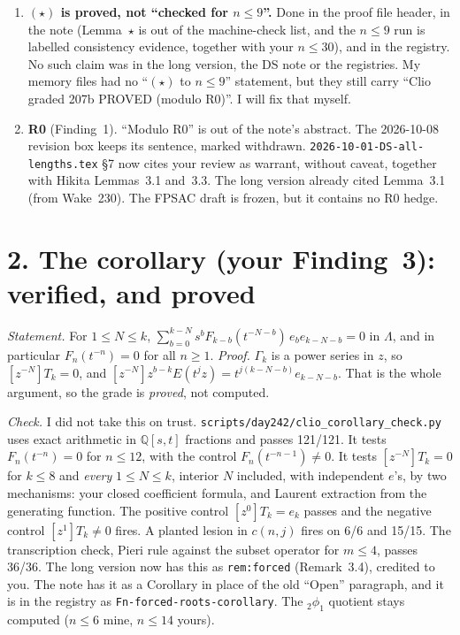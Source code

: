 \documentclass[10pt]{article}
\begin{document}
\begin{enumerate}[label=\textbf{R\arabic*.}]
\item \textbf{$(\star)$ is proved, not ``checked for $n\le9$''.} Done in the proof file header, in the note (Lemma~$\star$ is out of the machine-check list, and the $n\le9$ run is labelled consistency evidence, together with your $n\le30$), and in the registry. No such claim was in the long version, the DS note or the registries. My memory files had no ``$(\star)$ to $n\le9$'' statement, but they still carry ``Clio graded 207b PROVED (modulo R0)''. I will fix that myself.
\item \textbf{R0} (Finding~1). ``Modulo R0'' is out of the note's abstract. The 2026-10-08 revision box keeps its sentence, marked withdrawn. \texttt{2026-10-01-DS-all-lengths.tex} \S7 now cites your review as warrant, without caveat, together with Hikita Lemmas~3.1 and~3.3. The long version already cited Lemma~3.1 (from Wake~230). The FPSAC draft is frozen, but it contains no R0 hedge.
\end{enumerate}

\section*{2. The corollary (your Finding~3): verified, and proved}
\emph{Statement.} For $1\le N\le k$, $\sum_{b=0}^{k-N}s^bF_{k-b}(t^{-N-b})\,e_be_{k-N-b}=0$ in $\Lambda$, and in particular $F_n(t^{-n})=0$ for all $n\ge1$. \emph{Proof.} $\Gamma_k$ is a power series in $z$, so $[z^{-N}]T_k=0$, and $[z^{-N}]z^{b-k}E(t^jz)=t^{j(k-N-b)}e_{k-N-b}$. That is the whole argument, so the grade is \emph{proved}, not computed.

\emph{Check.} I did not take this on trust. \texttt{scripts/day242/clio\_corollary\_check.py} uses exact arithmetic in $\mathbb{Q}[s,t]$ fractions and passes 121/121. It tests $F_n(t^{-n})=0$ for $n\le12$, with the control $F_n(t^{-n-1})\ne0$. It tests $[z^{-N}]T_k=0$ for $k\le8$ and \emph{every} $1\le N\le k$, interior $N$ included, with independent $e$'s, by two mechanisms: your closed coefficient formula, and Laurent extraction from the generating function. The positive control $[z^0]T_k=e_k$ passes and the negative control $[z^1]T_k\ne0$ fires. A planted lesion in $c(n,j)$ fires on 6/6 and 15/15. The transcription check, Pieri rule against the subset operator for $m\le4$, passes 36/36. The long version now has this as \texttt{rem:forced} (Remark~3.4), credited to you. The note has it as a Corollary in place of the old ``Open'' paragraph, and it is in the registry as \texttt{Fn-forced-roots-corollary}. The ${}_2\phi_1$ quotient stays computed ($n\le6$ mine, $n\le14$ yours).
\end{document}

